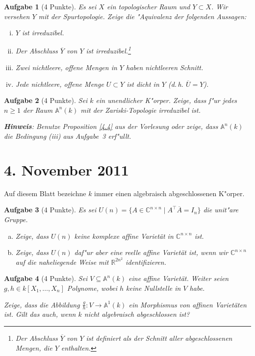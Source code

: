 \documentclass[a4paper, 12pt, numbers=noendperiod, chapterprefix=true]{scrbook}
\theoremstyle{break}
\newtheorem{Aufg}{Aufgabe}
\theoremstyle{nonumberbreak}
\theoremstyle{nonumberplain}
\newcommand{\R}{\mathbb{R}}
\newcommand{\C}{\mathbb{C}}
\newcommand{\A}{\mathbb{A}}
\newcommand{\Affine}{\mathbb{A}} %
\begin{document}
\begin{Aufg}[4 Punkte]
Es sei $X$ ein topologischer Raum und $Y\subset X$. Wir versehen $Y$ mit der Spurtopologie. Zeige die "Aquivalenz der folgenden Aussagen:
\begin{enumerate}[i)]
	\item $Y$ ist irreduzibel.
	\item Der Abschluss $\overline{Y}$ von $Y$ ist irreduzibel.\footnote{Der Abschluss $\overline{Y}$ von $Y$ ist definiert als der Schnitt aller abgeschlossenen Mengen, die $Y$ enthalten.}
	\item Zwei nichtleere, offene Mengen in $Y$ haben nichtleeren Schnitt.
	\item Jede nichtleere, offene Menge $U\subset Y$ ist dicht in $Y$ (d.\,h. $\overline{U} = Y$).
\end{enumerate}\end{Aufg}

\begin{Aufg}[4 Punkte]
Sei $k$ ein unendlicher K"orper. Zeige, dass f"ur jedes $n \geq 1$ der Raum $\Affine^n(k)$ mit der Zariski-Topologie irreduzibel ist.
 
\textbf{Hinweis}: Benutze Proposition \ref{4.4} aus der Vorlesung oder zeige, dass $\Affine^n(k)$ die Bedingung (iii) aus Aufgabe~3 erf"ullt.
\end{Aufg}

\newpage
\section{4. November 2011}
\setcounter{Aufg}{0}
\setcounter{Loes}{0}

Auf diesem Blatt bezeichne $k$ immer einen algebraisch abgeschlossenen K"orper.

\begin{Aufg}[4 Punkte]
Es sei $U(n) = \{ A \in \C^{n \times n} \mid A^\top \overline A = I_n \}$ die unit"are Gruppe.
\begin{enumerate}[a)]
	\item Zeige, dass $U(n)$ keine komplexe affine Variet\"at in $\C^{n \times n}$ ist.
	\item Zeige, dass $U(n)$ daf"ur aber eine reelle affine Variet\"at ist, wenn wir $\C^{n \times n}$ auf die naheliegende Weise mit $\R^{2n^2}$ identifizieren.
\end{enumerate}\end{Aufg}

\begin{Aufg}[4 Punkte]
Sei $V \subseteq \Affine^n(k)$ eine affine Variet\"at. Weiter seien $g,h \in k[X_1, \ldots, X_n]$ Polynome, wobei $h$ keine Nullstelle in $V$ habe. 

Zeige, dass die Abbildung $\frac{g}{h} : V \to \Affine^1(k)$ ein Morphismus von affinen Variet\"aten ist. Gilt das auch, wenn $k$ nicht algebraisch abgeschlossen ist?
\end{Aufg}
\end{document}
